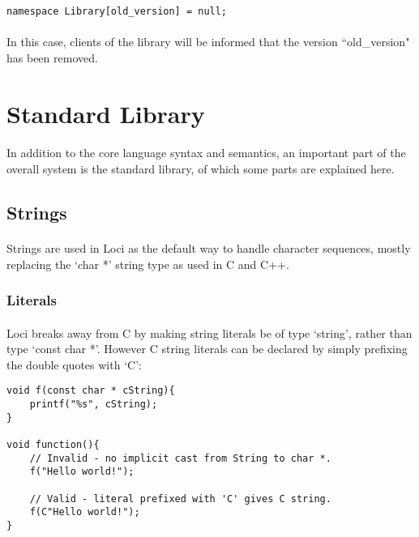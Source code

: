 \documentclass[12pt,twoside,notitlepage]{report}
\begin{document}
\begin{lstlisting}
namespace Library[old_version] = null;
\end{lstlisting}

\paragraph{}
In this case, clients of the library will be informed that the version ``old\_version" has been removed.

\clearpage

\section{Standard Library}

\paragraph{}
In addition to the core language syntax and semantics, an important part of the overall system is the standard library, of which some parts are explained here.

\subsection{Strings}

\paragraph{}
Strings are used in Loci as the default way to handle character sequences, mostly replacing the `char *' string type as used in C and C++.

\subsubsection{Literals}

\paragraph{}
Loci breaks away from C by making string literals be of type `string', rather than type `const char *'. However C string literals can be declared by simply prefixing the double quotes with `C':


\begin{lstlisting}
void f(const char * cString){
	printf("%s", cString);
}

void function(){
	// Invalid - no implicit cast from String to char *.
	f("Hello world!");
	
	// Valid - literal prefixed with 'C' gives C string.
	f(C"Hello world!");
}
\end{lstlisting}
\end{document}
